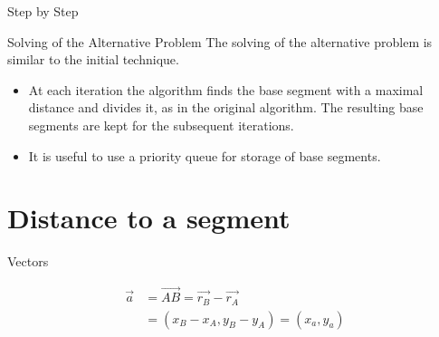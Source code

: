 \documentclass[10pt]{beamer}
\begin{document}
\begin{frame}{Step by Step}
	\begin{figure}[h]
	\end{figure}

\end{frame}

\begin{frame}{Solving of the Alternative Problem}
	The solving of the alternative problem is similar to the initial technique.
	\begin{itemize}
		\item At each iteration the algorithm finds the base segment with a maximal distance
		and divides it, as in the original algorithm. The resulting base segments are kept
		for the subsequent iterations.
		\item It is useful to use a priority queue for storage of base segments.  
	\end{itemize}
	
\end{frame}

\section{Distance to a segment}

\begin{frame}{Vectors}

		\begin{figure}[h]
		\end{figure}
		
		\begin{align*}
				\overrightarrow{a} & = \overrightarrow{AB} = \overrightarrow{r_B} - \overrightarrow{r_A} \\
				 & = (x_B-x_A,y_B-y_A) = (x_a,y_a) 	
		\end{align*}


\end{frame}
\end{document}
